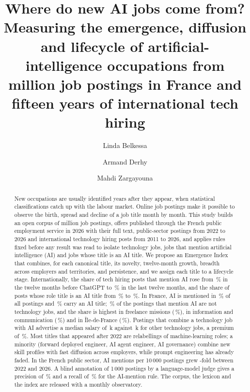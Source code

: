 \documentclass[3p,times,10pt,authoryear]{elsarticle}
\providecommand{\euro}{\texteuro}
\begin{document}
\begin{frontmatter}
\title{Where do new AI jobs come from? Measuring the emergence, diffusion and lifecycle of artificial-intelligence occupations from \nAll{} million job postings in France and fifteen years of international tech hiring}

\author[elia,eiffel]{Linda Belkessa}
\author[elia]{Armand Derhy}
\author[eiffel,elia]{Mahdi Zargayouna}

\begin{abstract}
New occupations are usually identified years after they appear, when statistical classifications catch up with the labour market. Online job postings make it possible to observe the birth, spread and decline of a job title month by month. This study builds an open corpus of \nAll{} million job postings, \nFT{} offers published through the French public employment service in 2026 with their full text, \nCSP{} public-sector postings from 2022 to 2026 and \nHN{} international technology hiring posts from 2011 to 2026, and applies rules fixed before any result was read to isolate technology jobs, jobs that mention artificial intelligence (AI) and jobs whose title is an AI title. We propose an Emergence Index that combines, for each canonical title, its novelty, twelve-month growth, breadth across employers and territories, and persistence, and we assign each title to a lifecycle stage. Internationally, the share of tech hiring posts that mention AI rose from \hnAIpre\,\% in the twelve months before ChatGPT to \hnAIlast\,\% in the last twelve months, and the share of posts whose role title is an AI title from \hnCorepre\,\% to \hnCorelast\,\%. In France, AI is mentioned in \pAI\,\% of all postings and \pCore\,\% carry an AI title; \pAIoutside\,\% of the postings that mention AI are not technology jobs, and the share is highest in freelance missions (\conLIB\,\%), in information and communication (\nafJ\,\%) and in \^Ile-de-France (\idfShare\,\%). Postings that combine a technology job with AI advertise a median salary of \salAItech\,k\euro{} against \salTech\,k\euro{} for other technology jobs, a premium of \salPremAItech\,\%. Most titles that appeared after 2022 are relabellings of machine-learning roles; a minority (forward deployed engineer, AI agent engineer, AI governance) combine new skill profiles with fast diffusion across employers, while prompt engineering has already faded. In the French public sector, AI mentions per 10\,000 postings grew \cspRatio-fold between 2022 and 2026. A blind annotation of 1\,000 postings by a language-model judge gives a precision of \precAiAny\,\% and a recall of \recAiAny\,\% for the AI-mention rule. The corpus, the lexicon and the index are released with a monthly observatory.
\end{abstract}


\end{frontmatter}
\end{document}
